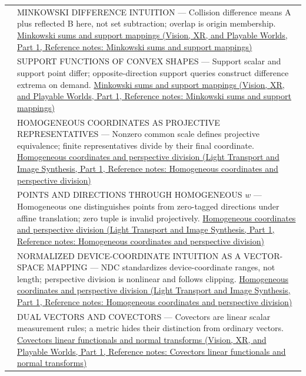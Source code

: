 {\begin{longtable}[]{@{}
  >{\raggedright\arraybackslash}p{}
  >{\raggedright\arraybackslash}p{}@{}}
576 & MINKOWSKI DIFFERENCE INTUITION --- Collision difference means A plus reflected B here, not set subtraction; overlap is origin membership. \href{../07-Vision-XR-and-Playable-Worlds-P01/main.pdf\#nameddest=appendix-215ac7099a82}{Minkowski sums and support mappings (Vision, XR, and Playable Worlds, Part 1, Reference notes: Minkowski sums and support mappings)} \\
577 & SUPPORT FUNCTIONS OF CONVEX SHAPES --- Support scalar and support point differ; opposite-direction support queries construct difference extrema on demand. \href{../07-Vision-XR-and-Playable-Worlds-P01/main.pdf\#nameddest=appendix-215ac7099a82}{Minkowski sums and support mappings (Vision, XR, and Playable Worlds, Part 1, Reference notes: Minkowski sums and support mappings)} \\
578 & HOMOGENEOUS COORDINATES AS PROJECTIVE REPRESENTATIVES --- Nonzero common scale defines projective equivalence; finite representatives divide by their final coordinate. \href{../04-Light-Transport-and-Image-Synthesis-P01/main.pdf\#nameddest=appendix-cb3b26862282}{Homogeneous coordinates and perspective division (Light Transport and Image Synthesis, Part 1, Reference notes: Homogeneous coordinates and perspective division)} \\
579 & POINTS AND DIRECTIONS THROUGH HOMOGENEOUS \(w\) --- Homogeneous one distinguishes points from zero-tagged directions under affine translation; zero tuple is invalid projectively. \href{../04-Light-Transport-and-Image-Synthesis-P01/main.pdf\#nameddest=appendix-cb3b26862282}{Homogeneous coordinates and perspective division (Light Transport and Image Synthesis, Part 1, Reference notes: Homogeneous coordinates and perspective division)} \\
580 & NORMALIZED DEVICE-COORDINATE INTUITION AS A VECTOR-SPACE MAPPING --- NDC standardizes device-coordinate ranges, not length; perspective division is nonlinear and follows clipping. \href{../04-Light-Transport-and-Image-Synthesis-P01/main.pdf\#nameddest=appendix-cb3b26862282}{Homogeneous coordinates and perspective division (Light Transport and Image Synthesis, Part 1, Reference notes: Homogeneous coordinates and perspective division)} \\
581 & DUAL VECTORS AND COVECTORS --- Covectors are linear scalar measurement rules; a metric hides their distinction from ordinary vectors. \href{../07-Vision-XR-and-Playable-Worlds-P01/main.pdf\#nameddest=appendix-46da295c6787}{Covectors linear functionals and normal transforms (Vision, XR, and Playable Worlds, Part 1, Reference notes: Covectors linear functionals and normal transforms)} \\

\end{longtable}}
